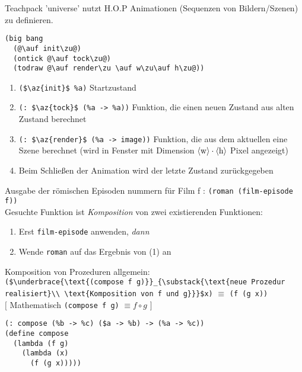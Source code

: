
Teachpack 'universe' nutzt H.O.P Animationen (Sequenzen von Bildern/Szenen) zu definieren.
\begin{lstlisting}
(big bang
  (@\auf init\zu@)
  (ontick @\auf tock\zu@)
  (todraw @\auf render\zu \auf w\zu\auf h\zu@))
\end{lstlisting}
\begin{enumerate}[-]
\item \lstinline[mathescape]|($\az{init}$ %a)| Startzustand
\item \lstinline[mathescape]|(: $\az{tock}$ (%a -> %a))|
Funktion, die einen neuen Zustand aus alten Zustand berechnet
\item \lstinline[mathescape]|(: $\az{render}$ (%a -> image))| Funktion, die aus dem aktuellen eine Szene berechnet (wird in Fenster mit Dimension $\langle \text{w}\rangle \cdot \langle \text{h}\rangle$ Pixel angezeigt)
\item Beim Schlie\ss en der Animation wird der letzte Zustand zurückgegeben
\end{enumerate}
Ausgabe der römischen Episoden nummern für Film f : \lstinline|(roman (film-episode f))|\\
Gesuchte Funktion ist \emph{Komposition} von zwei existierenden Funktionen:
\begin{enumerate}[(1)]
\item Erst \lstinline[mathescape]|film-episode| anwenden, \emph{dann}
\item Wende \lstinline[mathescape]|roman| auf das Ergebnis von (1) an
\end{enumerate}
Komposition von Prozeduren allgemein:\\
\lstinline[mathescape]|($\underbrace{\text{(compose f g)}}_{\substack{\text{neue Prozedur realisiert}\\ \text{Komposition von f und g}}}$x)| $\equiv$ \lstinline|(f (g x))|\\
$\lbrack$ Mathematisch \lstinline|(compose f g)| $\equiv f \circ g$ $\rbrack$\\
\begin{lstlisting}
(: compose (%b -> %c) ($a -> %b) -> (%a -> %c))
(define compose
  (lambda (f g)
    (lambda (x)
      (f (g x)))))
\end{lstlisting}
